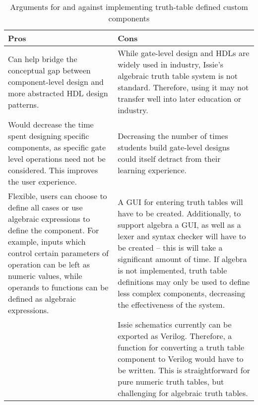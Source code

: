 \begin{table}[!ht]
    \centering
    \begin{tabular}{|m{7cm}|m{7cm}|}
    \hline
        Pros & Cons \\ \hline
        Can help bridge the conceptual gap between component-level design and more abstracted HDL design patterns. & While gate-level design and HDLs are widely used in industry, Issie's algebraic truth table system is not standard. Therefore, using it may not transfer well into later education or industry. \\ \hline
        Would decrease the time spent designing specific components, as specific gate level operations need not be considered. This improves the user experience. & Decreasing the number of times students build gate-level designs could itself detract from their learning experience. \\ \hline
        Flexible, users can choose to define all cases or use algebraic expressions to define the component. For example, inputs which control certain parameters of operation can be left as numeric values, while operands to functions can be defined as algebraic expressions. & A GUI for entering truth tables will have to be created. Additionally, to support algebra a GUI, as well as a lexer and syntax checker will have to be created -- this is will take a significant amount of time. If algebra is not implemented, truth table definitions may only be used to define less complex components, decreasing the effectiveness of the system. \\ \hline
        ~ & Issie schematics currently can be exported as Verilog. Therefore, a function for converting a truth table component to Verilog would have to be written. This is straightforward for pure numeric truth tables, but challenging for algebraic truth tables. \\ \hline
    \end{tabular}
    \caption{Arguments for and against implementing truth-table defined custom components}
    \label{tab:logicinput}
\end{table}



